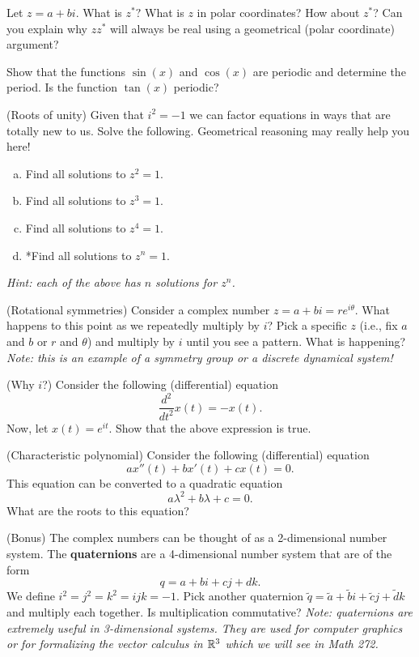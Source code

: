\documentclass[12pt]{article} %
\begin{document}
\begin{problem}
Let $z=a+bi$.  What is $z^*?$  What is $z$ in polar coordinates? How about $z^*$? Can you explain why $zz^*$ will always be real using a geometrical (polar coordinate) argument?
\end{problem}

\begin{problem}
Show that the functions $\sin(x)$ and $\cos(x)$ are periodic and determine the period.  Is the function $\tan(x)$ periodic?
\end{problem}

\begin{problem}
(Roots of unity) Given that $i^2=-1$ we can factor equations in ways that are totally new to us.  Solve the following. Geometrical reasoning may really help you here!
\begin{enumerate}[(a)]
    \item Find all solutions to $z^2=1$.
    \item Find all solutions to $z^3=1$.
    \item Find all solutions to $z^4=1$.
    \item *Find all solutions to $z^n=1$.
\end{enumerate}
\emph{Hint: each of the above has $n$ solutions for $z^n$.}
\end{problem}

\begin{problem}
(Rotational symmetries) Consider a complex number $z=a+bi=re^{i\theta}$. What happens to this point as we repeatedly multiply by $i$? Pick a specific $z$ (i.e., fix $a$ and $b$ or $r$ and $\theta$) and multiply by $i$ until you see a pattern.  What is happening? \emph{Note: this is an example of a symmetry group or a discrete dynamical system!}
\end{problem}

\begin{problem}
(Why $i$?) Consider the following (differential) equation
\[
\frac{d^2}{dt^2}x(t)=-x(t).
\]
Now, let $x(t)=e^{it}$.  Show that the above expression is true.
\end{problem}

\begin{problem}
(Characteristic polynomial) Consider the following (differential) equation
\[
ax''(t)+bx'(t)+cx(t)=0.
\]
This equation can be converted to a quadratic equation
\[
a\lambda^2 + b\lambda + c = 0.
\]
What are the roots to this equation?
\end{problem}

\begin{problem}
(Bonus) The complex numbers can be thought of as a 2-dimensional number system. The \textbf{quaternions} are a 4-dimensional number system that are of the form
\[
q = a+bi+cj+dk.
\]
We define $i^2=j^2=k^2=ijk=-1$. Pick another quaternion $\tilde{q}=\tilde{a}+\tilde{b}i+\tilde{c}j+\tilde{d}k$ and multiply each together. Is multiplication commutative? \emph{Note: quaternions are extremely useful in 3-dimensional systems. They are used for computer graphics or for formalizing the vector calculus in $\mathbb{R}^3$ which we will see in Math 272.}
\end{problem}
\end{document}
